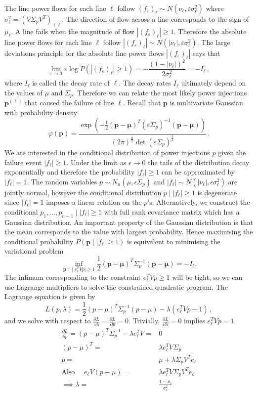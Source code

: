 \documentclass{article}
\newcommand{\e}{\varepsilon}
\renewcommand{\l}{\ell}
\begin{document}
The line power flows for each line $\l$ follow $(f_\e)_\l\sim N(\nu_\l, \e \sigma_\l^2)$ where $\sigma_\l^2 = \left(V\Sigma_p V^T\right)_{\l\l}$. The direction of flow across a line corresponds to the sign of $\mu_\l$. A line fails when the magnitude of flow $|(f_\e)_\l|\ge 1$. Therefore the absolute line power flows for each line $\l$ follow $|(f_\e)_\l |\sim N(|\nu_\l |, \e \sigma_\l^2)$. The large deviations principle for the absolute line power flows $|(f_\e)_\l|$ says that
\[\lim_{\e\to 0} \e \log P(|(f_\e)_\l|\ge 1) =-\frac{(1-|\nu_\l| )^2}{2\sigma_\l^2} = -I_\l \,,\]
where $I_\l$ is called the decay rate of $\l$. The decay rates $I_\l$ ultimately depend on the values of $\mu$ and $\Sigma_p$. Therefore we can relate the most likely power injections $\bm p^{(\l)}$ that caused the failure of line $\l$. Recall that $\bm p$ is multivariate Gaussian with probability density 
\[\varphi(\bm p) = \frac{\exp(-\frac{1}{2}(\bm p - \bm \mu)^T(\e\Sigma_p)^{-1}(\bm p-\bm \mu))}{(2\pi)^{\frac{n}{2}}\det(\e\Sigma_p)^{\frac{1}{2}}} \,.\]
We are interested in the conditional distribution of power injections $p$ given the failure event $|f_\ell| \ge1$. Under the limit as $\epsilon\to 0$ the tails of the distribution decay exponentially and therefore the probability $|f_\ell| \ge1$ can be approximated by $|f_\ell| =1$. The random variables $p\sim N_n(\mu,\epsilon\Sigma_p)$ and $|f_\ell|\sim N(|\nu_\ell|,\epsilon\sigma_\ell^2)$ are jointly normal, however the conditional distribution $p\mid |f_\ell| \ge1$ is degenerate since $|f_\ell| =1$ imposes a linear relation on the $p$'s. Alternatively, we construct the conditional $p_1,\dots,p_{n-1}\mid |f_\ell| \ge1$ with full rank covariance matrix which has a Gaussian distribution. An important property of the Gaussian distribution is that the mean corresponds to the value with largest probability. Hence maximising the conditional probability $P(\bm p\mid |f_\l|\ge 1)$ is equivalent to minimising the variational problem
\[\inf_{\bm p\ :\ \mid e_\l^TVp \mid \ge 1} \frac{1}{2}(\bm p - \bm \mu)^T\Sigma_p^{-1}(\bm p-\bm \mu) = -I_\l.\]
The infimum corresponding to the constraint $e_\ell^TVp\ge 1$ will be tight, so we can use Lagrange multipliers to solve the constrained quadratic program. The Lagrange equation is given by
\[L( p,\lambda) = \frac{1}{2}( p -  \mu)^T\Sigma_p^{-1}( p- \mu) -\lambda(e_\ell^TVp -1)\,,\]
and we solve with respect to $\frac{\partial L}{\partial \lambda} = \frac{\partial L}{\partial p} = 0$. Trivially, $\frac{\partial L}{\partial \lambda}=0$ implies $e_\ell^TVp =1$. 
\[\begin{aligned}\frac{\partial L}{\partial p} = ( p -  \mu)^T\Sigma_p^{-1}-\lambda e_\ell^TV =& 0\\
( p -  \mu)^T =& \lambda e_\ell^TV \Sigma_p\\
p =& \mu + \lambda\Sigma_pV^Te_\ell\\
\text{Also }\quad e_\ell V(p-\mu) =& \lambda e_\ell^T V \Sigma_pV^Te_\ell\\
\implies \lambda =& \frac{1-\nu_\ell}{\sigma_{\ell}^2}
\end{aligned}\]
\end{document}
